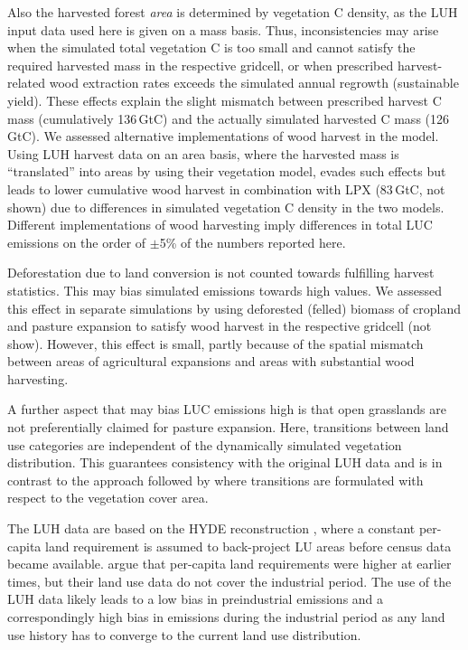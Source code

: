 Also the harvested forest {\it area} is determined by vegetation C density, as the LUH input data used here is given on a mass basis. Thus, inconsistencies may arise when the simulated total vegetation C is too small and cannot satisfy the required harvested mass in the respective gridcell, or when prescribed harvest-related wood extraction rates exceeds the simulated annual regrowth (sustainable yield). These effects explain the slight mismatch between prescribed harvest C mass (cumulatively 136\,GtC) and the actually simulated harvested C mass (126\,GtC). We assessed alternative implementations of wood harvest in the model. Using LUH harvest data on an area basis, where the harvested mass is ``translated'' into areas by \citet{hurtt06gcb} using their vegetation model, evades such effects but leads to lower cumulative wood harvest in combination with LPX (83\,GtC, not shown) due to differences in simulated vegetation C density in the two models. Different implementations of wood harvesting imply differences in total LUC emissions on the order of $\pm$5\% of the numbers reported here.

Deforestation due to land conversion is not counted towards fulfilling harvest statistics. This may bias simulated emissions towards high values. We assessed this effect in separate simulations by using deforested (felled) biomass of cropland and pasture expansion to satisfy wood harvest in the respective gridcell (not show). However, this effect is small, partly because of the spatial mismatch between areas of agricultural expansions and areas with substantial wood harvesting.

A further aspect that may bias LUC emissions high is that open grasslands are not preferentially claimed for pasture expansion. Here, transitions between land use categories are independent of the dynamically simulated vegetation distribution. This guarantees consistency with the original LUH data and is in contrast to the approach followed by \citet{reick2013} where transitions are formulated with respect to the  vegetation cover area.

The LUH data are based on the HYDE reconstruction \citep{kleingoldewijk2011geb}, where a constant per-capita land requirement is assumed to back-project LU areas before census data became available. \citet{kaplan11} argue that per-capita land requirements were higher at earlier times, but their land use data do not cover the industrial period. The use of the LUH data likely leads to a low bias in preindustrial emissions and a correspondingly high bias in emissions during the industrial period as any land use history has to converge to the current land use distribution.

